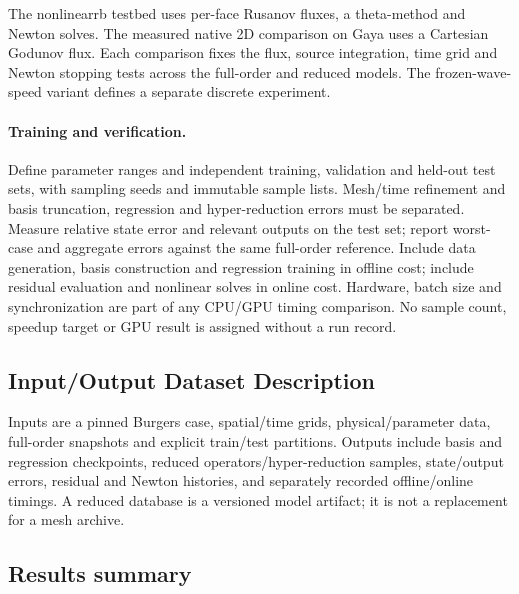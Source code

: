 The nonlinearrb testbed uses per-face Rusanov fluxes, a theta-method and
Newton solves. The measured native 2D comparison on Gaya uses a Cartesian
Godunov flux. Each comparison fixes the flux, source integration, time
grid and Newton stopping tests across the full-order and reduced models.
The frozen-wave-speed variant defines a separate discrete experiment.

\paragraph{Training and verification.}
Define parameter ranges and independent training, validation and held-out test
sets, with sampling seeds and immutable sample lists. Mesh/time refinement and
basis truncation, regression and hyper-reduction errors must be separated.
Measure relative state error and relevant outputs on the test set; report
worst-case and aggregate errors against the same full-order reference. Include
data generation, basis construction and regression training in offline cost;
include residual evaluation and nonlinear solves in online cost. Hardware,
batch size and synchronization are part of any CPU/GPU timing comparison.
No sample count, speedup target or GPU result is assigned without a run record.

\subsection{Input/Output Dataset Description}
Inputs are a pinned Burgers case, spatial/time grids, physical/parameter data,
full-order snapshots and explicit train/test partitions. Outputs include basis
and regression checkpoints, reduced operators/hyper-reduction samples,
state/output errors, residual and Newton histories, and separately recorded
offline/online timings. A reduced database is a versioned model artifact; it
is not a replacement for a mesh archive.

\subsection{Results summary}


